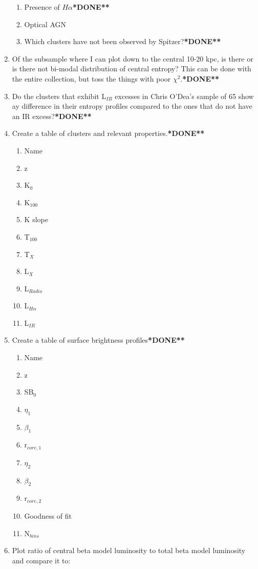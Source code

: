 \documentclass[11pt]{article}
\begin{document}
\begin{enumerate}
\begin{enumerate}
\item Presence of $H\alpha${\bf**DONE**}
\item Optical AGN
\item Which clusters have not been observed by Spitzer?{\bf**DONE**}
\end{enumerate}
\item Of the subsample where I can plot down to the central 10-20 kpc,
is there or is there not bi-modal distribution of central entropy?
This can be done with the entire collection, but toss the things with
poor $\chi^2$.{\bf**DONE**}
\item Do the clusters that exhibit L$_{IR}$ excesses in Chris O'Dea's
sample of 65 show ay difference in their entropy profiles compared to
the ones that do not have an IR excess?{\bf**DONE**}
\item Create a table of clusters and relevant properties.{\bf**DONE**}
\begin{enumerate}
\item Name
\item z
\item K$_0$
\item K$_{100}$
\item K slope
\item T$_{100}$
\item T$_X$
\item L$_X$
\item L$_{Radio}$
\item L$_{H\alpha}$
\item L$_{IR}$
\end{enumerate}
\item Create a table of surface brightness profiles{\bf**DONE**}
\begin{enumerate}
\item Name
\item z
\item SB$_0$
\item $\eta_1$
\item $\beta_1$
\item r$_{core,1}$
\item $\eta_2$
\item $\beta_2$
\item r$_{core,2}$
\item Goodness of fit
\item N$_{bins}$
\end{enumerate}
\item Plot ratio of central beta model luminosity to total beta model
luminosity and compare it to:

\end{enumerate}
\end{document}
